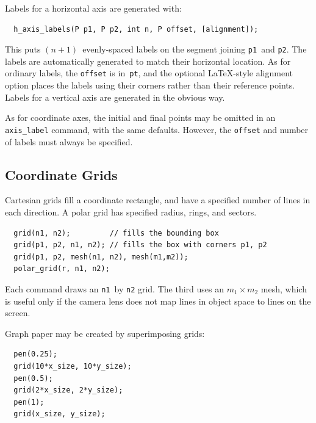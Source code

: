 \documentclass[12pt]{report}
\newcommand{\code}[1]{\texttt{#1}}
\begin{document}
Labels for a horizontal axis are generated with:
\begin{verbatim}
  h_axis_labels(P p1, P p2, int n, P offset, [alignment]);
\end{verbatim}
This puts $(n+1)$~evenly-spaced labels on the segment joining
\code{p1}~and \code{p2}. The labels are automatically generated to
match their horizontal location. As for ordinary labels, the
\code{offset} is in~\code{pt}, and the optional \LaTeX-style alignment
option places the labels using their corners rather than their
reference points. Labels for a vertical axis are generated in
the obvious way.

As for coordinate axes, the initial and final points may be omitted in
an \code{axis\_label} command, with the same defaults.  However, the
\code{offset} and number of labels must always be specified.


\subsection*{Coordinate Grids} 

Cartesian grids fill a coordinate rectangle, and have a specified
number of lines in each direction. A polar grid has specified radius,
rings, and sectors.
\begin{verbatim}
  grid(n1, n2);         // fills the bounding box
  grid(p1, p2, n1, n2); // fills the box with corners p1, p2
  grid(p1, p2, mesh(n1, n2), mesh(m1,m2));
  polar_grid(r, n1, n2);
\end{verbatim}
Each command draws an \code{n1}~by \code{n2} grid. The third uses
an $m_1\times m_2$ mesh, which is useful only if the camera lens does
not map lines in object space to lines on the screen.

Graph paper may be created by superimposing grids:
\begin{center}
  \begin{minipage}[b]{2.5in}
    \begin{footnotesize}
\begin{verbatim}
  pen(0.25);
  grid(10*x_size, 10*y_size);
  pen(0.5);
  grid(2*x_size, 2*y_size);
  pen(1);
  grid(x_size, y_size);
\end{verbatim}
    \end{footnotesize}
  \end{minipage}
  \qquad
  
\end{center}
  
\end{document}
